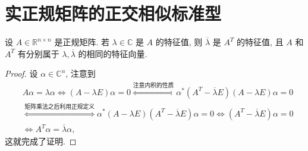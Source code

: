 \documentclass[../../main.tex]{subfiles}
\begin{document}
\section{实正规矩阵的正交相似标准型}

\begin{lemma}\label{lemma:正规矩阵与其转置有相同特征向量}
设 $A \in \mathbb{R}^{n \times n}$ 是正规矩阵. 若 $\lambda \in \mathbb{C}$ 是 $A$ 的特征值, 则 $\overline{\lambda}$ 是 $A^T$ 的特征值, 且 $A$ 和 $A^T$ 有分别属于 $\lambda,\overline{\lambda}$ 的相同的特征向量.
\end{lemma}
\begin{proof}
设 $\alpha \in \mathbb{C}^n$, 注意到
\begin{align*}
&A\alpha = \lambda\alpha \iff (A - \lambda E)\alpha = 0 \stackrel{\text{注意内积的性质}}{\iff} \alpha^*(A^T - \overline{\lambda}E)(A - \lambda E)\alpha = 0 \\
&\stackrel{\text{矩阵乘法之后利用正规定义}}{\iff} \alpha^*(A - \lambda E)(A^T - \overline{\lambda}E)\alpha = 0 \iff (A^T - \overline{\lambda}E)\alpha = 0 
\\
&\iff A^T\alpha = \overline{\lambda}\alpha,
\end{align*}
这就完成了证明.
\end{proof}
\end{document}
